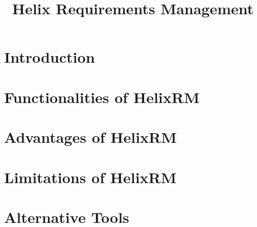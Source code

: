 \documentclass[conference]{IEEEtran}
\begin{document}
\title{Helix Requirements Management\\

}



\maketitle



\section{Introduction}\label{sec:introduction}


\section{Functionalities of HelixRM}\label{sec:functionalities-of-helixrm}






\section{Advantages of HelixRM}\label{sec:advantages-of-helixrm}


\section{Limitations of HelixRM}\label{sec:limitations-of-helixrm}


\section{Alternative Tools}\label{sec:alternative-tools}




\end{document}
